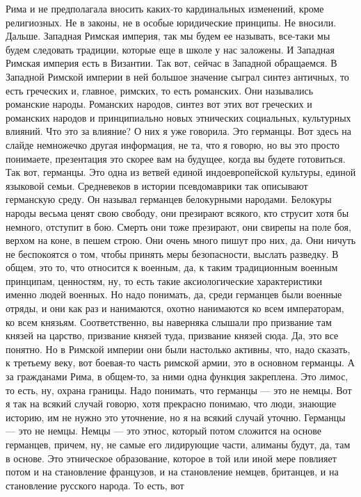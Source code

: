 Рима и не предполагала вносить каких-то кардинальных изменений, кроме
религиозных. Не в законы, не в особые юридические принципы. Не вносили. Дальше.
Западная Римская империя, так мы будем ее называть, все-таки мы будем следовать
традиции, которые еще в школе у нас заложены. И Западная Римская империя есть в
Византии. Так вот, сейчас в Западной обращаемся. В Западной Римской империи в
ней большое значение сыграл синтез античных, то есть греческих и, главное,
римских, то есть романских. Они назывались романские народы. Романских народов,
синтез вот этих вот греческих и романских народов и принципиально новых
этнических социальных, культурных влияний. Что это за влияние? О них я уже
говорила. Это германцы. Вот здесь на слайде немножечко другая информация, не та,
что я говорю, но вы это просто понимаете, презентация это скорее вам на будущее,
когда вы будете готовиться. Так вот, германцы. Это одна из ветвей единой
индоевропейской культуры, единой языковой семьи. Средневеков в истории
псевдомаврики так описывают германскую среду. Он называл германцев белокурными
народами. Белокуры народы весьма ценят свою свободу, они презирают всякого, кто
струсит хотя бы немного, отступит в бою. Смерть они тоже презирают, они свирепы
на поле боя, верхом на коне, в пешем строю. Они очень много пишут про них, да.
Они ничуть не беспокоятся о том, чтобы принять меры безопасности, выслать
разведку. В общем, это то, что относится к военным, да, к таким традиционным
военным принципам, ценностям, ну, то есть такие аксиологические характеристики
именно людей военных. Но надо понимать, да, среди германцев были военные отряды,
и они как раз и нанимаются, охотно нанимаются ко всем императорам, ко всем
князьям. Соответственно, вы наверняка слышали про призвание там князей на
царство, призвание князей туда, призвание князей сюда. Да, это все понятно. Но в
Римской империи они были настолько активны, что, надо сказать, к третьему веку,
вот боевая-то часть римской армии, это в основном германцы. А за гражданами
Рима, в общем-то, за ними одна функция закреплена. Это лимос, то есть, ну,
охрана границы. Надо понимать, что германцы — это не немцы. Вот я так на всякий
случай говорю, хотя прекрасно понимаю, что люди, знающие историю, им не нужно
это уточнение, но я на всякий случай уточню. Германцы — это не немцы. Немцы —
это этнос, который потом сложится на основе германцев, причем, ну, не самые его
лидирующие части, алиманы будут, да, там в основе. Это этническое образование,
которое в той или иной мере повлияет потом и на становление французов, и на
становление немцев, британцев, и на становление русского народа. То есть, вот
